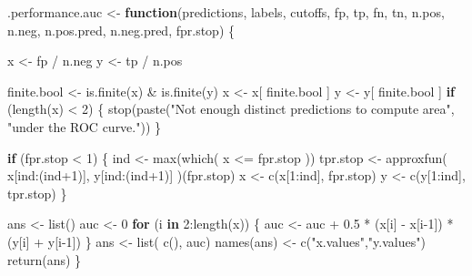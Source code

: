 \documentclass[
  letterpaper,
  DIV=11,
  numbers=noendperiod]{scrartcl}
\newenvironment{Shaded}{\begin{snugshade}}{\end{snugshade}}
\newcommand{\ControlFlowTok}[1]{\textcolor[rgb]{0.00,0.23,0.31}{\textbf{#1}}}
\newcommand{\DecValTok}[1]{\textcolor[rgb]{0.68,0.00,0.00}{#1}}
\newcommand{\FloatTok}[1]{\textcolor[rgb]{0.68,0.00,0.00}{#1}}
\newcommand{\FunctionTok}[1]{\textcolor[rgb]{0.28,0.35,0.67}{#1}}
\newcommand{\NormalTok}[1]{\textcolor[rgb]{0.00,0.23,0.31}{#1}}
\newcommand{\OtherTok}[1]{\textcolor[rgb]{0.00,0.23,0.31}{#1}}
\newcommand{\SpecialCharTok}[1]{\textcolor[rgb]{0.37,0.37,0.37}{#1}}
\newcommand{\StringTok}[1]{\textcolor[rgb]{0.13,0.47,0.30}{#1}}
\begin{document}
\begin{Shaded}
\begin{Highlighting}[]
\NormalTok{.performance.auc }\OtherTok{\textless{}{-}}
  \ControlFlowTok{function}\NormalTok{(predictions, labels, cutoffs, fp, tp, fn, tn,}
\NormalTok{           n.pos, n.neg, n.pos.pred, n.neg.pred, fpr.stop) \{}
      
\NormalTok{      x }\OtherTok{\textless{}{-}}\NormalTok{ fp }\SpecialCharTok{/}\NormalTok{ n.neg}
\NormalTok{      y }\OtherTok{\textless{}{-}}\NormalTok{ tp }\SpecialCharTok{/}\NormalTok{ n.pos}

\NormalTok{      finite.bool }\OtherTok{\textless{}{-}} \FunctionTok{is.finite}\NormalTok{(x) }\SpecialCharTok{\&} \FunctionTok{is.finite}\NormalTok{(y)}
\NormalTok{      x }\OtherTok{\textless{}{-}}\NormalTok{ x[ finite.bool ]}
\NormalTok{      y }\OtherTok{\textless{}{-}}\NormalTok{ y[ finite.bool ]}
      \ControlFlowTok{if}\NormalTok{ (}\FunctionTok{length}\NormalTok{(x) }\SpecialCharTok{\textless{}} \DecValTok{2}\NormalTok{) \{}
          \FunctionTok{stop}\NormalTok{(}\FunctionTok{paste}\NormalTok{(}\StringTok{"Not enough distinct predictions to compute area"}\NormalTok{,}
                     \StringTok{"under the ROC curve."}\NormalTok{))}
\NormalTok{      \}}

      \ControlFlowTok{if}\NormalTok{ (fpr.stop }\SpecialCharTok{\textless{}} \DecValTok{1}\NormalTok{) \{}
\NormalTok{        ind }\OtherTok{\textless{}{-}} \FunctionTok{max}\NormalTok{(}\FunctionTok{which}\NormalTok{( x }\SpecialCharTok{\textless{}=}\NormalTok{ fpr.stop ))}
\NormalTok{        tpr.stop }\OtherTok{\textless{}{-}} \FunctionTok{approxfun}\NormalTok{( x[ind}\SpecialCharTok{:}\NormalTok{(ind}\SpecialCharTok{+}\DecValTok{1}\NormalTok{)], y[ind}\SpecialCharTok{:}\NormalTok{(ind}\SpecialCharTok{+}\DecValTok{1}\NormalTok{)] )(fpr.stop)}
\NormalTok{        x }\OtherTok{\textless{}{-}} \FunctionTok{c}\NormalTok{(x[}\DecValTok{1}\SpecialCharTok{:}\NormalTok{ind], fpr.stop)}
\NormalTok{        y }\OtherTok{\textless{}{-}} \FunctionTok{c}\NormalTok{(y[}\DecValTok{1}\SpecialCharTok{:}\NormalTok{ind], tpr.stop)}
\NormalTok{      \}}
      
\NormalTok{      ans }\OtherTok{\textless{}{-}} \FunctionTok{list}\NormalTok{()}
\NormalTok{      auc }\OtherTok{\textless{}{-}} \DecValTok{0}
      \ControlFlowTok{for}\NormalTok{ (i }\ControlFlowTok{in} \DecValTok{2}\SpecialCharTok{:}\FunctionTok{length}\NormalTok{(x)) \{}
\NormalTok{          auc }\OtherTok{\textless{}{-}}\NormalTok{ auc }\SpecialCharTok{+} \FloatTok{0.5} \SpecialCharTok{*}\NormalTok{ (x[i] }\SpecialCharTok{{-}}\NormalTok{ x[i}\DecValTok{{-}1}\NormalTok{]) }\SpecialCharTok{*}\NormalTok{ (y[i] }\SpecialCharTok{+}\NormalTok{ y[i}\DecValTok{{-}1}\NormalTok{])}
\NormalTok{      \}}
\NormalTok{      ans }\OtherTok{\textless{}{-}} \FunctionTok{list}\NormalTok{( }\FunctionTok{c}\NormalTok{(), auc)}
      \FunctionTok{names}\NormalTok{(ans) }\OtherTok{\textless{}{-}} \FunctionTok{c}\NormalTok{(}\StringTok{"x.values"}\NormalTok{,}\StringTok{"y.values"}\NormalTok{)}
      \FunctionTok{return}\NormalTok{(ans)}
\NormalTok{  \}}


\end{Highlighting}
\end{Shaded}
\end{document}
